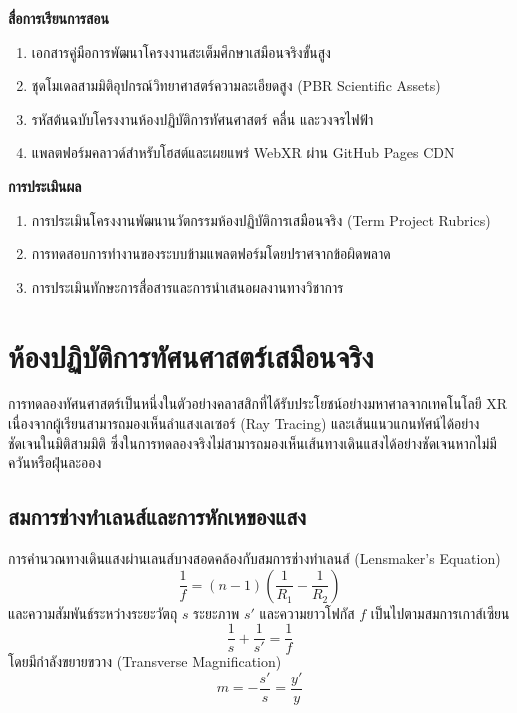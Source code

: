 \noindent\textbf{สื่อการเรียนการสอน}
\begin{enumerate}
    \item เอกสารคู่มือการพัฒนาโครงงานสะเต็มศึกษาเสมือนจริงขั้นสูง
    \item ชุดโมเดลสามมิติอุปกรณ์วิทยาศาสตร์ความละเอียดสูง (PBR Scientific Assets)
    \item รหัสต้นฉบับโครงงานห้องปฏิบัติการทัศนศาสตร์ คลื่น และวงจรไฟฟ้า
    \item แพลตฟอร์มคลาวด์สำหรับโฮสต์และเผยแพร่ WebXR ผ่าน GitHub Pages CDN
\end{enumerate}

\noindent\textbf{การประเมินผล}
\begin{enumerate}
    \item การประเมินโครงงานพัฒนานวัตกรรมห้องปฏิบัติการเสมือนจริง (Term Project Rubrics)
    \item การทดสอบการทำงานของระบบข้ามแพลตฟอร์มโดยปราศจากข้อผิดพลาด
    \item การประเมินทักษะการสื่อสารและการนำเสนอผลงานทางวิชาการ
\end{enumerate}

\newpage

\section{ห้องปฏิบัติการทัศนศาสตร์เสมือนจริง}

การทดลองทัศนศาสตร์เป็นหนึ่งในตัวอย่างคลาสสิกที่ได้รับประโยชน์อย่างมหาศาลจากเทคโนโลยี XR เนื่องจากผู้เรียนสามารถมองเห็นลำแสงเลเซอร์ (Ray Tracing) และเส้นแนวแกนทัศน์ได้อย่างชัดเจนในมิติสามมิติ ซึ่งในการทดลองจริงไม่สามารถมองเห็นเส้นทางเดินแสงได้อย่างชัดเจนหากไม่มีควันหรือฝุ่นละออง

\subsection{สมการช่างทำเลนส์และการหักเหของแสง}

การคำนวณทางเดินแสงผ่านเลนส์บางสอดคล้องกับสมการช่างทำเลนส์ (Lensmaker's Equation)
\begin{equation}
\frac{1}{f} = (n - 1)\left(\frac{1}{R_1} - \frac{1}{R_2}\right)
\end{equation}
และความสัมพันธ์ระหว่างระยะวัตถุ $s$ ระยะภาพ $s'$ และความยาวโฟกัส $f$ เป็นไปตามสมการเกาส์เซียน
\begin{equation}
\frac{1}{s} + \frac{1}{s'} = \frac{1}{f}
\end{equation}
โดยมีกำลังขยายขวาง (Transverse Magnification)
\begin{equation}
m = -\frac{s'}{s} = \frac{y'}{y}
\end{equation}

